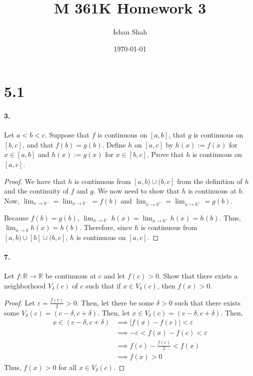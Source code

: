 \documentclass[12pt]{article}
\theoremstyle{remark}
\begin{document}
\title{M 361K Homework 3}
\author{Ishan Shah}
\date{\today}
\maketitle

\section*{5.1}
\paragraph{3.} Let $a<b<c$. Suppose that $f$ is continuous on $[a, b]$, that $g$ is continuous on $[b, c]$, and that $f(b)=g(b)$. Define $h$ on $[a, c]$ by $h(x):=f(x)$ for $x \in[a, b]$ and $h(x):=g(x)$ for $x \in[b, c]$. Prove that $h$ is continuous on $[a, c]$.
\begin{proof}
    We have that $h$ is continuous from $[a, b) \cup (b, c]$ from the definition of $h$ and the continuity of $f$ and $g$. We now need to show that $h$ is continuous at $b$. Now, $\lim_{x \to b^-} = \lim_{x \to b^-} = f(b)$ and $\lim_{x \to b^+} = \lim_{x \to b^+} = g(b)$. 
    
    Because $f(b) = g(b)$, $\lim_{x \to b^-} h(x) = \lim_{x \to b^+} h(x) = h(b)$. Thus, $\lim_{x \to b} h(x) = h(b)$. Therefore, since $h$ is continuous from $[a, b) \cup [b] \cup (b, c]$, $h$ is continuous on $[a, c]$.
\end{proof}

\paragraph{7.} Let $f: \mathbb{R} \rightarrow \mathbb{R}$ be continuous at $c$ and let $f(c)>0$. Show that there exists a neighborhood $V_\delta(c)$ of $c$ such that if $x \in V_\delta(c)$, then $f(x)>0$.
\begin{proof}
    Let $\varepsilon = \frac{f(c)}{2} > 0$. Then, let there be some $\delta > 0$ such that there exists some $V_\delta(c) = (c - \delta, c + \delta)$. Then, let $x \in V_\delta(c) = (c - \delta, c + \delta)$. Then,
    \begin{align*}
        x \in (c - \delta, c + \delta) &\implies |f(x) - f(c)| < \varepsilon \\
        &\implies -\varepsilon < f(x) - f(c) < \varepsilon \\
        &\implies f(c) - \frac{f(c)}{2} < f(x) \\
        &\implies f(x) > 0
    \end{align*}
    Thus, $f(x) > 0$ for all $x \in V_\delta(c)$.
\end{proof}
\end{document}
